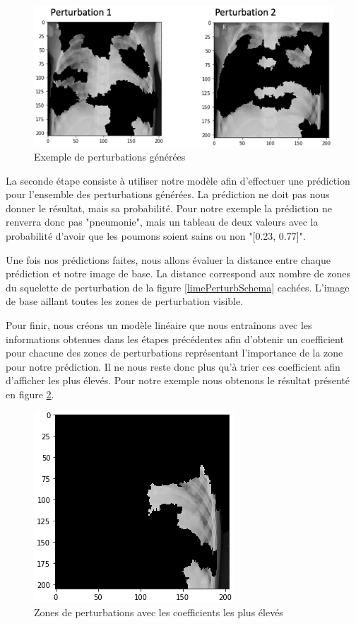 \begin{figure}[h]
    \includegraphics[scale=0.7]{src_img/limePerturbations.png}
    \caption{Exemple de perturbations générées}
    \label{limePerturbExemple}
\end{figure}

La seconde étape consiste à utiliser notre modèle afin d'effectuer une prédiction pour l'ensemble des perturbations générées. La prédiction ne doit pas nous donner le résultat, mais sa probabilité. Pour notre exemple la prédiction ne renverra donc pas "pneumonie", mais un tableau de deux valeurs avec la probabilité d'avoir que les poumons soient sains ou non "[0.23, 0.77]".\par
Une fois nos prédictions faites, nous allons évaluer la distance entre chaque prédiction et notre image de base. La distance correspond aux nombre de zones du squelette de perturbation de la figure \ref{limePerturbSchema} cachées. L'image de base aillant toutes les zones de perturbation visible.\par
Pour finir, nous créons un modèle linéaire que nous entraînons avec les informations obtenues dans les étapes précédentes afin d'obtenir un coefficient pour chacune des zones de perturbations représentant l'importance de la zone pour notre prédiction. Il ne nous reste donc plus qu'à trier ces coefficient afin d'afficher les plus élevés. Pour notre exemple nous obtenons le résultat présenté en figure \ref{limeExplaine}.

\begin{figure}[h]
    \includegraphics[scale=0.7]{src_img/limeExplaine.png}
    \caption{Zones de perturbations avec les coefficients les plus élevés}
    \label{limeExplaine}
\end{figure}

